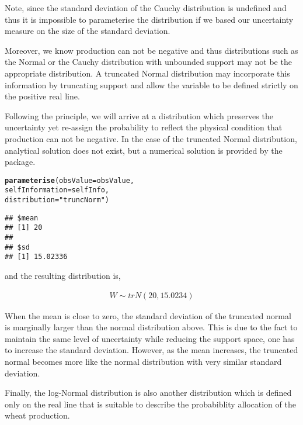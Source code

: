 \documentclass[nojss]{jss}\usepackage[]{graphicx}\usepackage[]{color}
\makeatletter
\newcommand{\hlstr}[1]{\textcolor[rgb]{0.192,0.494,0.8}{#1}}%
\newcommand{\hlstd}[1]{\textcolor[rgb]{0.345,0.345,0.345}{#1}}%
\newcommand{\hlkwc}[1]{\textcolor[rgb]{0.333,0.667,0.333}{#1}}%
\newcommand{\hlkwd}[1]{\textcolor[rgb]{0.737,0.353,0.396}{\textbf{#1}}}%
\newenvironment{kframe}{%
 \def\at@end@of@kframe{}%
 \ifinner\ifhmode%
  \def\at@end@of@kframe{\end{minipage}}%
  \begin{minipage}{\columnwidth}%
 \fi\fi%
 \def\FrameCommand##1{\hskip\@totalleftmargin \hskip-\fboxsep
 \colorbox{shadecolor}{##1}\hskip-\fboxsep
     \hskip-\linewidth \hskip-\@totalleftmargin \hskip\columnwidth}%
 \MakeFramed {\advance\hsize-\width
   \@totalleftmargin\z@ \linewidth\hsize
   \@setminipage}}%
 {\par\unskip\endMakeFramed%
 \at@end@of@kframe}
\newenvironment{knitrout}{}{} %
\makeatother
\begin{document}
Note, since the standard deviation of the Cauchy distribution is
undefined and thus it is impossible to parameterise the distribution
if we based our uncertainty measure on the size of the standard
deviation.


Moreover, we know production can not be negative and thus
distributions such as the Normal or the Cauchy distribution with
unbounded support may not be the appropriate distribution. A truncated
Normal distribution may incorporate this information by truncating
support and allow the variable to be defined strictly on the positive
real line.

Following the principle, we will arrive at a distribution which
preserves the uncertainty yet re-assign the probability to reflect the
physical condition that production can not be negative. In the case of
the truncated Normal distribution, analytical solution does not exist,
but a numerical solution is provided by the package.


\begin{knitrout}
\color{fgcolor}\begin{kframe}
\begin{alltt}
\hlkwd{parameterise}\hlstd{(}\hlkwc{obsValue} \hlstd{= obsValue,}
             \hlkwc{selfInformation} \hlstd{= selfInfo,}
             \hlkwc{distribution} \hlstd{=} \hlstr{"truncNorm"}\hlstd{)}
\end{alltt}
\begin{verbatim}
## $mean
## [1] 20
## 
## $sd
## [1] 15.02336
\end{verbatim}
\end{kframe}
\end{knitrout}

and the resulting distribution is,


\begin{align}
  W \sim trN(20, 15.0234)\nonumber
\end{align}

When the mean is close to zero, the standard deviation of the
truncated normal is marginally larger than the normal distribution
above. This is due to the fact to maintain the same level of
uncertainty while reducing the support space, one has to increase the
standard deviation. However, as the mean increases, the truncated
normal becomes more like the normal distribution with very similar
standard deviation.

Finally, the log-Normal distribution is also another distribution
which is defined only on the real line that is suitable to describe
the probabiblity allocation of the wheat production.
\end{document}
